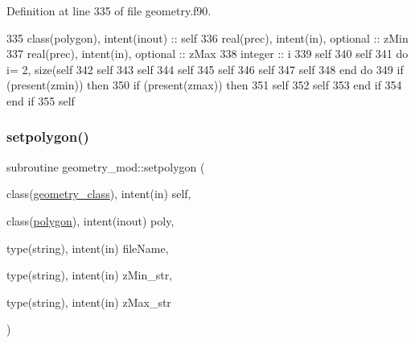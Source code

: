 Definition at line 335 of file geometry.\+f90.


\begin{DoxyCode}
335     \textcolor{keywordtype}{class}(polygon), \textcolor{keywordtype}{intent(inout)} :: self
336     \textcolor{keywordtype}{real(prec)}, \textcolor{keywordtype}{intent(in)}, \textcolor{keywordtype}{optional} :: zMin
337     \textcolor{keywordtype}{real(prec)}, \textcolor{keywordtype}{intent(in)}, \textcolor{keywordtype}{optional} :: zMax
338     \textcolor{keywordtype}{integer} :: i
339     self%
340     self%
341     \textcolor{keywordflow}{do} i= 2, \textcolor{keyword}{size}(self%
342         self%
343         self%
344         self%
345         self%
346         self%
347         self%
348 \textcolor{keywordflow}{    end do}
349     \textcolor{keywordflow}{if} (\textcolor{keyword}{present}(zmin)) \textcolor{keywordflow}{then}
350         \textcolor{keywordflow}{if} (\textcolor{keyword}{present}(zmax)) \textcolor{keywordflow}{then}
351             self%
352             self%
353 \textcolor{keywordflow}{        end if}
354 \textcolor{keywordflow}{    end if}
355     self%
\end{DoxyCode}
\mbox{\label{namespacegeometry__mod_a14008da67dcaf75e468b4487f0d96ef4}} 
\subsubsection{\texorpdfstring{setpolygon()}{setpolygon()}}
{\footnotesize\ttfamily subroutine geometry\+\_\+mod\+::setpolygon (\begin{DoxyParamCaption}\item[{class(\mbox{\hyperlink{structgeometry__mod_1_1geometry__class}{geometry\+\_\+class}}), intent(in)}]{self,  }\item[{class(\mbox{\hyperlink{structgeometry__mod_1_1polygon}{polygon}}), intent(inout)}]{poly,  }\item[{type(string), intent(in)}]{file\+Name,  }\item[{type(string), intent(in)}]{z\+Min\+\_\+str,  }\item[{type(string), intent(in)}]{z\+Max\+\_\+str }\end{DoxyParamCaption})\hspace{0.3cm}{\ttfamily [private]}}



